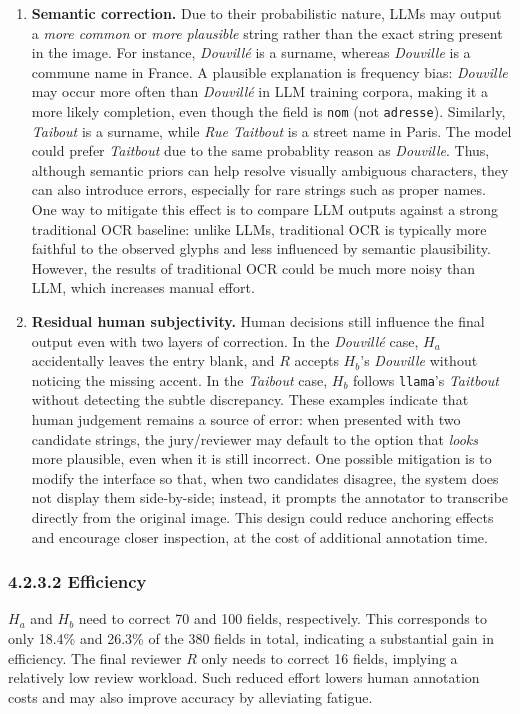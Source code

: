 \begin{enumerate}
    \item \textbf{Semantic correction.}
    Due to their probabilistic nature, LLMs may output a \emph{more common} or \emph{more plausible} string rather than the exact string present in the image. For instance, \textit{Douvill\'e} is a surname, whereas \textit{Douville} is  a commune name in France. A plausible explanation is frequency bias: \textit{Douville} may occur more often than \textit{Douvill\'e} in LLM training corpora, making it a more likely completion, even though the field is \texttt{nom} (not \texttt{adresse}). Similarly, \textit{Taibout} is a surname, while \textit{Rue Taitbout} is a  street name in Paris. The model could prefer \textit{Taitbout} due to the same probablity reason as \textit{Douville}.
    Thus, although semantic priors can help resolve visually ambiguous characters, they can also introduce errors, especially for rare strings such as proper names. One way to mitigate this effect is to compare LLM outputs against a strong traditional OCR baseline: unlike LLMs, traditional OCR is typically more faithful to the observed glyphs and less influenced by semantic plausibility. However, the results of traditional OCR could be much more noisy than LLM, which increases manual effort.
    \item \textbf{Residual human subjectivity.}
    Human decisions still influence the final output even with two layers of correction. In the \textit{Douvill\'e} case, $H_a$ accidentally leaves the entry blank, and $R$ accepts $H_b$'s \textit{Douville} without noticing the missing accent. In the \textit{Taibout} case, $H_b$ follows \texttt{llama}'s \textit{Taitbout} without detecting the subtle discrepancy. These examples indicate that human judgement remains a source of error: when presented with two candidate strings, the jury/reviewer may default to the option that \emph{looks} more plausible, even when it is still incorrect. One possible mitigation is to modify the interface so that, when two candidates disagree, the system does not display them side-by-side; instead, it prompts the annotator to transcribe directly from the original image. This design could reduce anchoring effects and encourage closer inspection, at the cost of additional annotation time.
\end{enumerate}

\subsubsection{4.2.3.2 Efficiency}
$H_a$ and $H_b$ need to correct 70 and 100 fields, respectively. This corresponds to only 18.4\% and 26.3\% of the 380 fields in total, indicating a substantial gain in efficiency. The final reviewer $R$ only needs to correct 16 fields, implying a relatively low review workload. Such reduced effort lowers human annotation costs and may also improve accuracy by alleviating fatigue.

